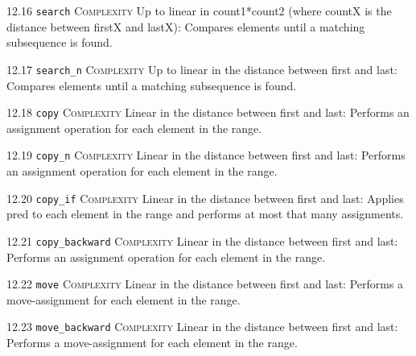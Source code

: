 \noindent\textcolor{corange}{12.16 \texttt{search}} \textsc{Complexity} Up to linear in count1*count2 (where countX is the distance between firstX and lastX): Compares elements until a matching subsequence is found. \vspace{0.5em}

\noindent\textcolor{corange}{12.17 \texttt{search\_n}} \textsc{Complexity} Up to linear in the distance between first and last: Compares elements until a matching subsequence is found. \vspace{0.5em}

\noindent\textcolor{corange}{12.18 \texttt{copy}} \textsc{Complexity} Linear in the distance between first and last: Performs an assignment operation for each element in the range. \vspace{0.5em}

\noindent\textcolor{corange}{12.19 \texttt{copy\_n}} \textsc{Complexity} Linear in the distance between first and last: Performs an assignment operation for each element in the range. \vspace{0.5em}

\noindent\textcolor{corange}{12.20 \texttt{copy\_if}} \textsc{Complexity} Linear in the distance between first and last: Applies pred to each element in the range and performs at most that many assignments. \vspace{0.5em}

\noindent\textcolor{corange}{12.21 \texttt{copy\_backward}} \textsc{Complexity} Linear in the distance between first and last: Performs an assignment operation for each element in the range. \vspace{0.5em}

\noindent\textcolor{corange}{12.22 \texttt{move}} \textsc{Complexity} Linear in the distance between first and last: Performs a move-assignment for each element in the range. \vspace{0.5em}

\noindent\textcolor{corange}{12.23 \texttt{move\_backward}} \textsc{Complexity} Linear in the distance between first and last: Performs a move-assignment for each element in the range. \vspace{0.5em}

